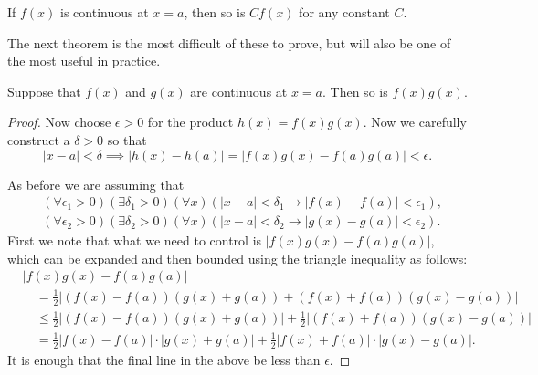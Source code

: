 \begin{theorem}If $f(x)$ is continuous at $x=a$, then
so is $Cf(x)$ for any constant $C$.
\label{MultiplicativeConstantsPreserveContinuity}\end{theorem}
The next theorem is the most difficult of these to prove,
but will also be one of the most useful in practice.

\begin{theorem}
\label{ProductOfContinuousFunctionsIsContinuous}Suppose that $f(x)$ and $g(x)$ are continuous
at $x=a$.  Then so is $f(x)g(x)$.
\end{theorem}

\begin{proof}
Now choose $\epsilon>0$ for the product $h(x)=f(x)g(x)$.
Now we carefully construct a $\delta>0$ so that
$$|x-a|<\delta\implies|h(x)-h(a)|=|f(x)g(x)-f(a)g(a)|<\epsilon.$$

As before we are assuming that 
\begin{align}
&(\forall \epsilon_1>0)(\exists \delta_1>0)(\forall x)(|x-a|<\delta_1
  \longrightarrow|f(x)-f(a)|<\epsilon_1),\label{ContinuityOfF}\\
&(\forall \epsilon_2>0)(\exists \delta_2>0)(\forall x)(|x-a|<\delta_2
  \longrightarrow|g(x)-g(a)|<\epsilon_2).\label{ContinuityOfG}\end{align}
First we note that what we need to control is $|f(x)g(x)-f(a)g(a)|$,
which can be expanded and then bounded  using the triangle 
inequality as follows:
\begin{align*}&|f(x)g(x)-f(a)g(a)|\\
&\quad=\frac12|(f(x)-f(a))(g(x)+g(a))+(f(x)+f(a))(g(x)-g(a))|\\
&\quad\le\frac12|(f(x)-f(a))(g(x)+g(a))|+\frac12|(f(x)+f(a))(g(x)-g(a))|\\
&\quad=\frac12|f(x)-f(a)|\cdot|g(x)+g(a)|+\frac12|f(x)+f(a)|\cdot|g(x)-g(a)|.
\end{align*}
It is enough that the final line in the above be less than $\epsilon$.


\end{proof}
